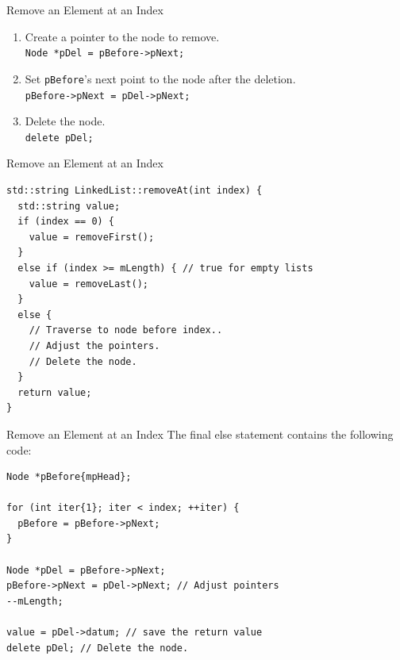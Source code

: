 \documentclass[14pt,aspectratio=1610, hyperref={pdfpagelayout=SinglePage}]{beamer}
\begin{document}
\begin{frame}[fragile, b]{Remove an Element at an Index}
\begin{enumerate}\addtocounter{enumi}{1}
\item Create a pointer to the node to remove.\\
  \lstinline{Node *pDel = pBefore->pNext;}
\item<3->
  Set \texttt{pBefore}'s next point to the node after the deletion.\\
  \lstinline{pBefore->pNext = pDel->pNext;}
\item<5->
  Delete the node.\\
  \lstinline{delete pDel;}%
\end{enumerate}
\vspace{-10pt}
\vspace{1.5em}
\end{frame}

\begin{frame}[fragile]{Remove an Element at an Index}
\begin{lstlisting}[basicstyle=\small\ttfamily]
std::string LinkedList::removeAt(int index) {
  std::string value;
  if (index == 0) {
    value = removeFirst();
  }
  else if (index >= mLength) { // true for empty lists
    value = removeLast();
  }
  else {
    // Traverse to node before index..
    // Adjust the pointers.
    // Delete the node.
  }
  return value;
}
\end{lstlisting}
\end{frame}

\begin{frame}[fragile]{Remove an Element at an Index}
The final else statement contains the following code:

\begin{lstlisting}[basicstyle=\small\ttfamily]
Node *pBefore{mpHead};

for (int iter{1}; iter < index; ++iter) {
  pBefore = pBefore->pNext;
}

Node *pDel = pBefore->pNext;
pBefore->pNext = pDel->pNext; // Adjust pointers
--mLength;

value = pDel->datum; // save the return value
delete pDel; // Delete the node.
\end{lstlisting}

\end{frame}
\end{document}
